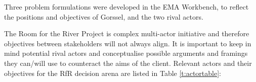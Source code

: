 
Three problem formulations were developed in the EMA Workbench, to reflect the positions and objectives of Gorssel, and the two rival actors.



The Room for the River Project is complex multi-actor initiative and therefore objectives between stakeholders will not always align. It is important to keep in mind potential rival actors and conceptualise possible arguments and framings they can/will use to counteract the aims of the client. Relevant actors and their objectives for the RfR decision arena are listed in Table \ref{t:actortable}:


